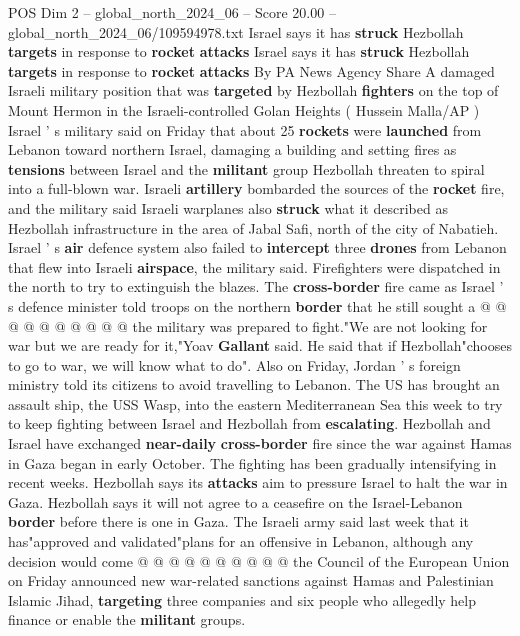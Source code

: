 \begin{textsample}{POS Dim 2 – global\_north\_2024\_06 – Score 20.00 – global\_north\_2024\_06/109594978.txt}  \label{ex:f2_pos_317}
Israel says it has \textbf{struck} Hezbollah \textbf{targets} in response to \textbf{rocket} \textbf{attacks} Israel says it has \textbf{struck} Hezbollah \textbf{targets} in response to \textbf{rocket} \textbf{attacks} By PA News Agency Share A damaged Israeli military position that was \textbf{targeted} by Hezbollah \textbf{fighters} on the top of Mount Hermon in the Israeli-controlled Golan Heights ( Hussein Malla/AP ) Israel ' s military said on Friday that about 25 \textbf{rockets} were \textbf{launched} from Lebanon toward northern Israel, damaging a building and setting fires as \textbf{tensions} between Israel and the \textbf{militant} group Hezbollah threaten to spiral into a full-blown war.
Israeli \textbf{artillery} bombarded the sources of the \textbf{rocket} fire, and the military said Israeli warplanes also \textbf{struck} what it described as Hezbollah infrastructure in the area of Jabal Safi, north of the city of Nabatieh.
Israel ' s \textbf{air} defence system also failed to \textbf{intercept} three \textbf{drones} from Lebanon that flew into Israeli \textbf{airspace}, the military said.
Firefighters were dispatched in the north to try to extinguish the blazes.
The \textbf{cross-border} fire came as Israel ' s defence minister told troops on the northern \textbf{border} that he still sought a @ @ @ @ @ @ @ @ @ @ the military was prepared to fight."We are not looking for war but we are ready for it,"Yoav \textbf{Gallant} said.
He said that if Hezbollah"chooses to go to war, we will know what to do".
Also on Friday, Jordan ' s foreign ministry told its citizens to avoid travelling to Lebanon.
The US has brought an assault ship, the USS Wasp, into the eastern Mediterranean Sea this week to try to keep fighting between Israel and Hezbollah from \textbf{escalating}.
Hezbollah and Israel have exchanged \textbf{near-daily} \textbf{cross-border} fire since the war against Hamas in Gaza began in early October.
The fighting has been gradually intensifying in recent weeks.
Hezbollah says its \textbf{attacks} aim to pressure Israel to halt the war in Gaza.
Hezbollah says it will not agree to a ceasefire on the Israel-Lebanon \textbf{border} before there is one in Gaza.
The Israeli army said last week that it has"approved and validated"plans for an offensive in Lebanon, although any decision would come @ @ @ @ @ @ @ @ @ @ the Council of the European Union on Friday announced new war-related sanctions against Hamas and Palestinian Islamic Jihad, \textbf{targeting} three companies and six people who allegedly help finance or enable the \textbf{militant} groups.

\end{textsample}
